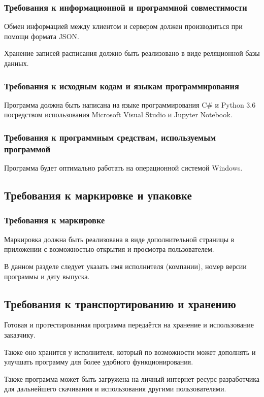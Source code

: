 \documentclass[14pt]{extarticle}
\begin{document}
\subsubsection {Требования к информационной и программной совместимости}
Обмен информацией между клиентом и сервером должен производиться при помощи формата JSON.
\par Хранение записей расписания должно быть реализовано в виде реляционной базы данных.
\subsubsection {Требования к исходным кодам и языкам программирования}
Программа должна быть написана на языке программирования C# и Python 3.6 посредством использования  Microsoft Visual Studio и Jupyter Notebook. 

\subsubsection {Требования к программным средствам, используемым программой}
Программа будет оптимально работать на операционной системой Windows.

\subsection {Требования к маркировке и упаковке}
\subsubsection {Требования к маркировке}
Маркировка должна быть реализована в виде дополнительной страницы в приложении с возможностью открытия и просмотра пользователем. 
\par В данном разделе следует указать имя исполнителя (компании), номер версии программы и дату выпуска.

\subsection {Требования к транспортированию и хранению}
Готовая и протестированная программа передаётся на хранение и использование заказчику. 
\par Также оно хранится у исполнителя, который по возможности может дополнять и улучшать программу для более удобного функционирования.
\par Также программа может быть загружена на личный интернет-ресурс разработчика для дальнейшего скачивания и использования другими пользователями.
\end{document}
